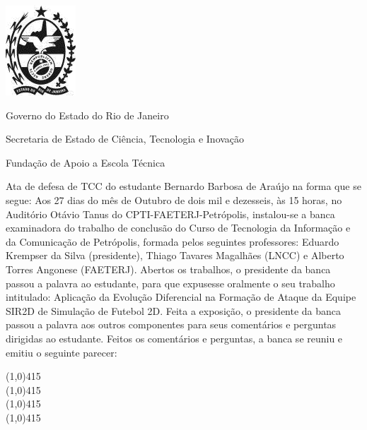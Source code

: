 \documentclass[a4paper]{report} %
\begin{document}

\begin{center}
	\includegraphics[scale=0.5]{images/brasao}
	
	
	Governo do Estado do Rio de Janeiro
	
	
	Secretaria de Estado de Ciência, Tecnologia e Inovação
	
	
	Fundação de Apoio a Escola Técnica
\end{center}

\vspace*{0.2cm}

\noindent Ata de defesa de TCC do estudante Bernardo Barbosa de Araújo na forma que se segue: Aos 27 dias do mês de Outubro de dois mil e dezesseis, às 15 horas, no Auditório Otávio Tanus do CPTI-FAETERJ-Petrópolis, instalou-se a banca examinadora do trabalho de conclusão do Curso de Tecnologia da Informação e da Comunicação de Petrópolis, formada pelos seguintes professores: Eduardo Krempser da Silva (presidente), Thiago Tavares Magalhães (LNCC) e Alberto Torres Angonese (FAETERJ). Abertos os trabalhos, o presidente da banca passou a palavra ao estudante, para que expusesse oralmente o seu trabalho intitulado: Aplicação da Evolução Diferencial na Formação de Ataque da Equipe SIR2D de Simulação de Futebol 2D. Feita a exposição, o presidente da banca passou a palavra aos outros componentes para seus comentários e perguntas dirigidas ao estudante. Feitos os comentários e perguntas, a banca se reuniu e emitiu o seguinte parecer:


\begin{center}
\line(1,0){415}\\
\line(1,0){415}\\
\line(1,0){415}\\
\line(1,0){415}\\
\end{center}
\end{document}
